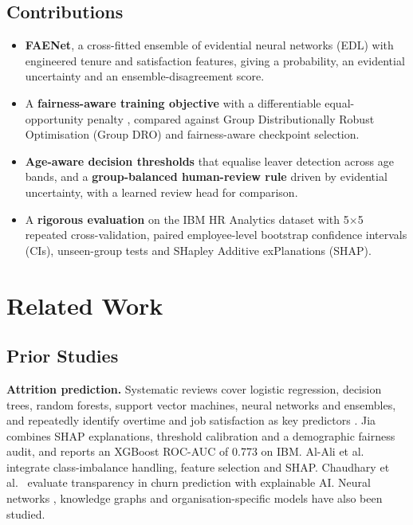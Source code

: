 \documentclass[conference]{IEEEtran}
\begin{document}
\subsection{Contributions}
\begin{itemize}
\item \textbf{FAENet}, a cross-fitted ensemble of evidential neural networks (EDL) \cite{sensoy2018} with engineered tenure and satisfaction features, giving a probability, an evidential uncertainty and an ensemble-disagreement score.
\item A \textbf{fairness-aware training objective} with a differentiable equal-opportunity penalty \cite{hardt2016}, compared against Group Distributionally Robust Optimisation (Group DRO) \cite{sagawa2020} and fairness-aware checkpoint selection.
\item \textbf{Age-aware decision thresholds} that equalise leaver detection across age bands, and a \textbf{group-balanced human-review rule} driven by evidential uncertainty, with a learned review head for comparison.
\item A \textbf{rigorous evaluation} on the IBM HR Analytics dataset with 5$\times$5 repeated cross-validation, paired employee-level bootstrap confidence intervals (CIs), unseen-group tests and SHapley Additive exPlanations (SHAP).
\end{itemize}

\section{Related Work}
\subsection{Prior Studies}
\textbf{Attrition prediction.} Systematic reviews cover logistic regression, decision trees, random forests, support vector machines, neural networks and ensembles, and repeatedly identify overtime and job satisfaction as key predictors \cite{talebi2025,alakasheh2024decade}. Jia \cite{jia2026} combines SHAP explanations, threshold calibration and a demographic fairness audit, and reports an XGBoost ROC-AUC of 0.773 on IBM. Al-Ali et al.\ \cite{alali2026} integrate class-imbalance handling, feature selection and SHAP. Chaudhary et al.\ \cite{chaudhary2025} evaluate transparency in churn prediction with explainable AI. Neural networks \cite{wu2024}, knowledge graphs \cite{alakasheh2024kg} and organisation-specific models \cite{varkiani2025} have also been studied.
\end{document}
